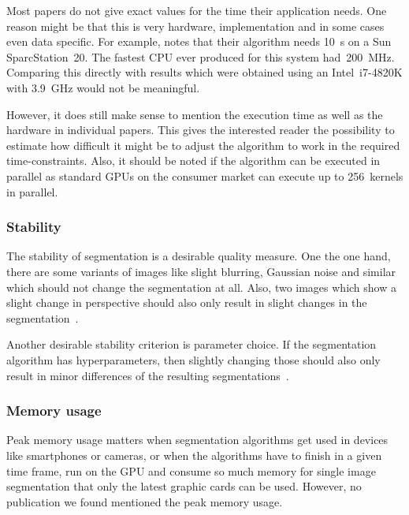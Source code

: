 Most papers do not give exact values for the time their application needs. One
reason might be that this is very hardware, implementation and in some cases
even data specific. For example, \cite{hoover1996experimental} notes that their
algorithm needs \SI{10}{\second} on a Sun SparcStation~20. The fastest CPU ever
produced for this system had~\SI{200}{\mega\hertz}. Comparing this directly
with results which were obtained using an Intel~i7-4820K with
\SI{3.9}{\giga\hertz} would not be meaningful.

However, it does still make sense to mention the execution time as well as the
hardware in individual papers. This gives the interested reader the possibility
to estimate how difficult it might be to adjust the algorithm to work in the
required time-constraints. Also, it should be noted if the algorithm can be
executed in parallel as standard \glspl{GPU} on the consumer market can execute
up to 256~kernels in parallel.



\subsubsection{Stability}%
\label{subsubsec:stability-quality-measure}%
The stability of segmentation is a desirable quality measure. One the one hand,
there are some variants of images like slight blurring, Gaussian noise and
similar which should not change the segmentation at all. Also, two images which
show a slight change in perspective should also only result in slight changes
in the segmentation~\cite{pantofaru2005comparison}.

Another desirable stability criterion is parameter choice. If the
segmentation algorithm has hyperparameters, then slightly changing those should
also only result in minor differences of the resulting
segmentations~\cite{pantofaru2005comparison}.


\subsubsection{Memory usage}
Peak memory usage matters when segmentation algorithms get used in devices like
smartphones or cameras, or when the algorithms have to finish in a given time
frame, run on the \gls{GPU} and consume so much memory for single image
segmentation that only the latest graphic cards can be used. However, no
publication we found mentioned the peak memory usage.
